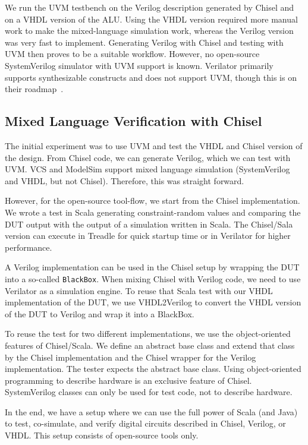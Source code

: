 \documentclass[conference]{IEEEtran}
\newcommand{\code}[1]{{\small{\texttt{#1}}}}
\begin{document}
We run the UVM testbench on the Verilog description generated by Chisel and on a VHDL version of the ALU. Using the VHDL version required more manual work to make the mixed-language simulation work, whereas the Verilog version was very fast to implement. Generating Verilog with Chisel and testing with UVM then proves to be a suitable workflow. However, no open-source SystemVerilog simulator with UVM support is known.
Verilator primarily supports synthesizable constructs and does not support UVM, though this is on their roadmap~\cite{Snyder2019}.


\subsection{Mixed Language Verification with Chisel}
\label{sec:verif-chisel}

The initial experiment was to use UVM and test the VHDL and Chisel version of the
design. From Chisel code, we can generate Verilog, which we can test with UVM.
VCS and ModelSim support mixed language simulation (SystemVerilog and VHDL,
but not Chisel). Therefore, this was straight forward.

However, for the open-source tool-flow, we start from the Chisel implementation.
We wrote a test in Scala generating constraint-random values and comparing
the DUT output with the output of a simulation written in Scala. 
The Chisel/Sala version can execute in Treadle for  quick startup time or in Verilator
for higher performance.

A Verilog implementation can be used in the Chisel setup by wrapping the DUT
into a so-called \code{BlackBox}. When mixing Chisel with Verilog code, we need
to use Verilator as a simulation engine.
To reuse that Scala test with our VHDL implementation of the DUT, we use VHDL2Verilog
to convert the VHDL version of the DUT to Verilog and wrap it into a BlackBox.

To reuse the test for two different implementations, we use the object-oriented features
of Chisel/Scala. We define an abstract base class and extend that class by the Chisel
implementation and the Chisel wrapper for the Verilog implementation.
The tester expects the abstract base class.
Using object-oriented programming to describe hardware is an exclusive
feature of Chisel. SystemVerilog classes can only be used for test code,
not to describe hardware.

In the end, we have a setup where we can use the full power of Scala (and Java)
to test, co-simulate, and verify digital circuits described in Chisel, Verilog, or VHDL.
This setup consists of open-source tools only.
\end{document}
